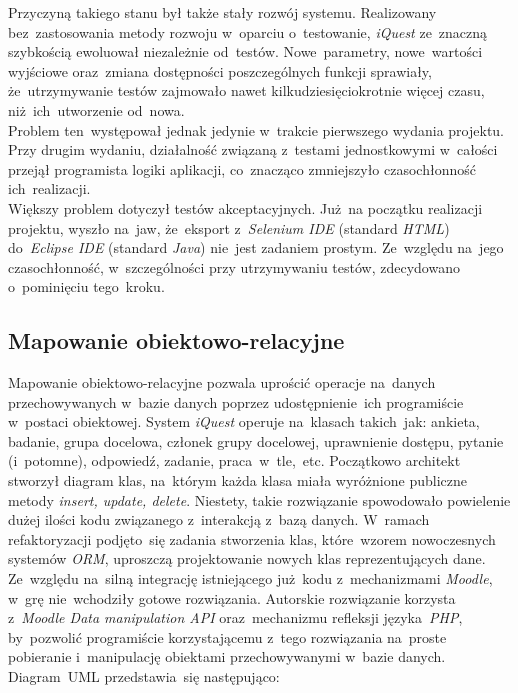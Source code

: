 Przyczyną takiego stanu był także stały rozwój systemu. Realizowany bez~zastosowania metody rozwoju w~oparciu o~testowanie, \textit{iQuest} ze~znaczną szybkością ewoluował niezależnie od~testów. Nowe~parametry, nowe~wartości wyjściowe oraz~zmiana dostępności poszczególnych funkcji sprawiały, że~utrzymywanie testów zajmowało nawet kilkudziesięciokrotnie więcej czasu, niż~ich~utworzenie od~nowa. \\

Problem ten~występował jednak jedynie w~trakcie pierwszego wydania projektu. Przy drugim wydaniu, działalność związaną z~testami jednostkowymi w~całości przejął programista logiki aplikacji, co~znacząco zmniejszyło czasochłonność ich~realizacji. \\

Większy problem dotyczył testów akceptacyjnych. Już~na początku realizacji projektu, wyszło na~jaw, że~eksport z~\textit{Selenium IDE} (standard \textit{HTML}) do~\textit{Eclipse IDE} (standard \textit{Java}) nie~jest zadaniem prostym. Ze~względu na~jego czasochłonność, w~szczególności przy utrzymywaniu testów, zdecydowano o~pominięciu tego~kroku. \\

\subsection{Mapowanie obiektowo-relacyjne}
\label{Chapter62c}

Mapowanie obiektowo-relacyjne pozwala uprościć operacje na~danych przechowywanych w~bazie danych poprzez udostępnienie~ich programiście w~postaci obiektowej. System \textit{iQuest} operuje na~klasach takich~jak: ankieta, badanie, grupa docelowa, członek grupy docelowej, uprawnienie dostępu, pytanie (i~potomne), odpowiedź, zadanie, praca~w~tle,~etc. Początkowo architekt stworzył diagram klas, na~którym każda klasa miała wyróżnione publiczne metody \textit{insert, update, delete}. Niestety, takie rozwiązanie spowodowało powielenie dużej ilości kodu związanego z~interakcją z~bazą danych. W~ramach refaktoryzacji podjęto~się zadania stworzenia klas, które~wzorem nowoczesnych systemów \textit{ORM}, uproszczą projektowanie nowych klas reprezentujących dane. Ze~względu na~silną integrację istniejącego już~kodu z~mechanizmami \textit{Moodle}, w~grę nie~wchodziły gotowe rozwiązania. Autorskie rozwiązanie korzysta z~\textit{Moodle Data manipulation API} oraz~mechanizmu refleksji języka~\textit{PHP}, by~pozwolić programiście korzystającemu z~tego rozwiązania na~proste pobieranie i~manipulację obiektami przechowywanymi w~bazie danych. Diagram~UML przedstawia~się następująco:

